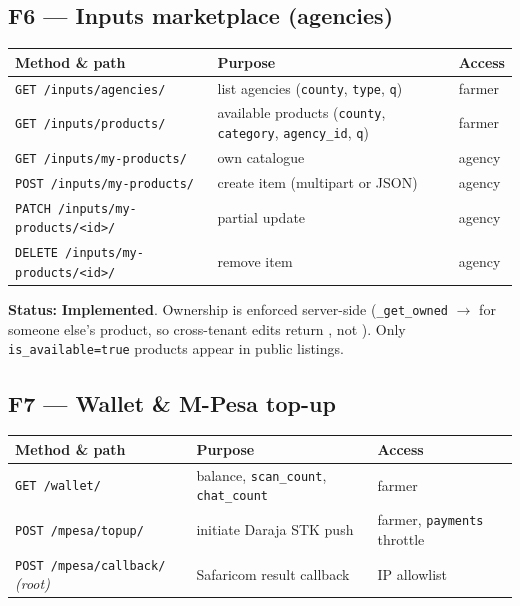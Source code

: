 \documentclass[11pt,a4paper]{article}
\newcommand{\done}{\textcolor{statusdone}{\textbf{Implemented}}}
\newcommand{\code}[1]{\texttt{\allowbreak #1\allowbreak}}
\begin{document}
\subsection{F6 --- Inputs marketplace (agencies)}
\begin{center}
\small
\begin{tabularx}{\textwidth}{@{} l X l @{}}
\toprule
\textbf{Method \& path} & \textbf{Purpose} & \textbf{Access} \\
\midrule
\code{GET /inputs/agencies/}          & list agencies (\code{county}, \code{type}, \code{q}) & farmer \\
\code{GET /inputs/products/}          & available products (\code{county}, \code{category}, \code{agency\_id}, \code{q}) & farmer \\
\code{GET  /inputs/my-products/}      & own catalogue & agency \\
\code{POST /inputs/my-products/}      & create item (multipart or JSON) & agency \\
\code{PATCH  /inputs/my-products/<id>/} & partial update & agency \\
\code{DELETE /inputs/my-products/<id>/} & remove item & agency \\
\bottomrule
\end{tabularx}
\end{center}

\textbf{Status:} \done. Ownership is enforced server-side
(\code{\_get\_owned} $\rightarrow$ \code{404} for someone else's product, so
cross-tenant edits return \code{404}, not \code{403}). Only
\code{is\_available=true} products appear in public listings.

\subsection{F7 --- Wallet \& M-Pesa top-up}
\begin{center}
\small
\begin{tabularx}{\textwidth}{@{} l X l @{}}
\toprule
\textbf{Method \& path} & \textbf{Purpose} & \textbf{Access} \\
\midrule
\code{GET /wallet/}                 & balance, \code{scan\_count}, \code{chat\_count} & farmer \\
\code{POST /mpesa/topup/}           & initiate Daraja STK push & farmer, \code{payments} throttle \\
\code{POST /mpesa/callback/} \textit{(root)} & Safaricom result callback & IP allowlist \\
\bottomrule
\end{tabularx}
\end{center}
\end{document}
